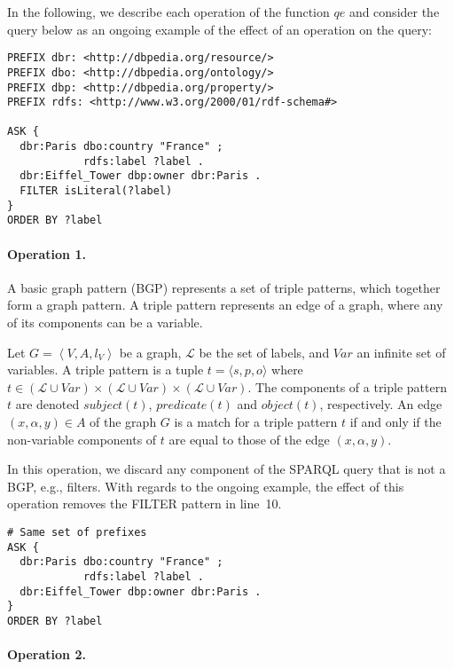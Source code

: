 In the following, we describe each operation of the function $qe$ and consider the query below as an ongoing example of the effect of an operation on the query:

\begin{verbatim}
PREFIX dbr: <http://dbpedia.org/resource/>
PREFIX dbo: <http://dbpedia.org/ontology/>
PREFIX dbp: <http://dbpedia.org/property/>
PREFIX rdfs: <http://www.w3.org/2000/01/rdf-schema#>

ASK {
  dbr:Paris dbo:country "France" ;
            rdfs:label ?label .
  dbr:Eiffel_Tower dbp:owner dbr:Paris .
  FILTER isLiteral(?label)
}
ORDER BY ?label
\end{verbatim}

\paragraph{Operation 1.}

A basic graph pattern (BGP) represents a set of triple patterns, which together form a graph pattern. A triple pattern represents an edge of a graph, where any of its components can be a variable.
\begin{definition}
Let $G=\left\langle V, A, l_V \right\rangle$ be a graph, $\mathcal{L}$ be the set of labels, and $Var$ an infinite set of variables.
A triple pattern is a tuple $t= \langle s, p, o \rangle$ where $t \in (\mathcal{L} \cup Var) \times (\mathcal{L} \cup Var) \times (\mathcal{L} \cup Var)$.
The components of a triple pattern $t$ are denoted $subject(t)$, $predicate(t)$ and $object(t)$, respectively.
An edge $(x,\alpha,y) \in A$ of the graph $G$ is a match for a triple pattern $t$ if and only if the non-variable components of $t$ are equal to those of the edge $(x, \alpha, y)$.
\label{def:triple-pattern}
\end{definition}

In this operation, we discard any component of the SPARQL query that is not a BGP, e.g., filters.
With regards to the ongoing example, the effect of this operation removes the FILTER pattern in line~10.
\begin{verbatim}
# Same set of prefixes
ASK {
  dbr:Paris dbo:country "France" ;
            rdfs:label ?label .
  dbr:Eiffel_Tower dbp:owner dbr:Paris .
}
ORDER BY ?label
\end{verbatim}

\paragraph{Operation 2.}

